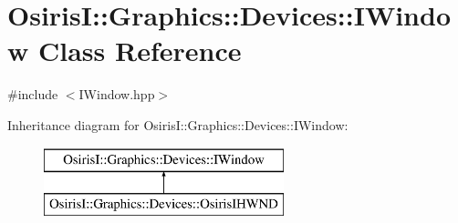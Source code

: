 \hypertarget{class_osiris_i_1_1_graphics_1_1_devices_1_1_i_window}{\section{Osiris\-I\-:\-:Graphics\-:\-:Devices\-:\-:I\-Window Class Reference}
\label{class_osiris_i_1_1_graphics_1_1_devices_1_1_i_window}
}


{\ttfamily \#include $<$I\-Window.\-hpp$>$}

Inheritance diagram for Osiris\-I\-:\-:Graphics\-:\-:Devices\-:\-:I\-Window\-:\begin{figure}[H]
\begin{center}
\leavevmode
\includegraphics[height=2.000000cm]{class_osiris_i_1_1_graphics_1_1_devices_1_1_i_window}
\end{center}
\end{figure}
